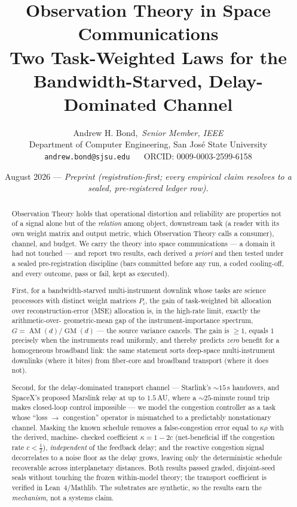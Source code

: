\documentclass[11pt]{article}
\title{\textbf{Observation Theory in Space Communications}\\[2pt]
\large Two Task-Weighted Laws for the Bandwidth-Starved,
Delay-Dominated Channel}
\author{Andrew H. Bond,~\emph{Senior Member, IEEE}\\
\small Department of Computer Engineering, San Jos\'e State University\\
\small \texttt{andrew.bond@sjsu.edu} ~\textbar~ ORCID: 0009-0003-2599-6158}
\date{August 2026 --- \emph{Preprint (registration-first; every empirical
claim resolves to a sealed, pre-registered ledger row).}}
\theoremstyle{definition}
\theoremstyle{remark}
\newcommand{\AM}{\operatorname{AM}}
\newcommand{\GM}{\operatorname{GM}}
\begin{document}
\maketitle

\begin{abstract}
Observation Theory holds that operational distortion and reliability are
properties not of a signal alone but of the \emph{relation} among object,
downstream task (a reader with its own weight matrix and output metric,
which Observation Theory calls a consumer),
channel, and budget. We carry the theory into space communications --- a
domain it had not touched --- and report two results, each derived
\emph{a priori} and then tested under a sealed pre-registration
discipline (bars committed before any run, a coded cooling-off, and every
outcome, pass or fail, kept as executed).

First, for a bandwidth-starved multi-instrument downlink whose tasks
are science processors with distinct weight matrices $P_i$, the gain of
task-weighted bit allocation over reconstruction-error (MSE)
allocation is, in the high-rate limit, exactly the arithmetic-over-%
geometric-mean gap of the instrument-importance spectrum,
$G=\AM(d)/\GM(d)$ --- the source variance cancels. The gain is $\ge 1$,
equals $1$ precisely when the instruments read uniformly, and thereby
predicts \emph{zero} benefit for a homogeneous broadband link: the same
statement sorts deep-space multi-instrument downlinks (where it bites)
from fiber-core and broadband transport (where it does not).

Second, for the delay-dominated transport channel --- Starlink's
$\sim\!15$\,s handovers, and SpaceX's proposed Marslink relay at up to
$1.5$\,AU, where a $\sim\!25$-minute round trip makes closed-loop control
impossible --- we model the congestion controller as a task whose
``loss $\to$ congestion'' operator is mismatched to a predictably
nonstationary channel. Masking the known schedule removes a
false-congestion error equal to $\kappa\rho$ with the derived, machine-%
checked coefficient $\kappa=1-2c$ (net-beneficial iff the congestion rate
$c<\tfrac12$), \emph{independent} of the feedback delay; and the
reactive congestion signal decorrelates to a noise floor as the delay
grows, leaving only the deterministic schedule recoverable across
interplanetary distances. Both results passed graded, disjoint-seed seals
without touching the frozen within-model theory; the transport
coefficient is verified in Lean~4/Mathlib. The substrates are synthetic,
so the results earn the \emph{mechanism}, not a systems claim.
\end{abstract}
\end{document}
